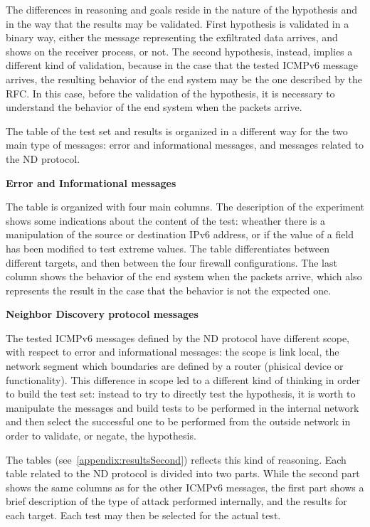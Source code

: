 \documentclass[12pt]{article}
\begin{document}
The differences in reasoning and goals reside in the nature of the hypothesis and in the way that the results may be validated. First hypothesis is validated in a binary way, either the message representing the exfiltrated data arrives, and shows on the receiver process, or not. The second hypothesis, instead, implies a different kind of validation, because in the case that the tested ICMPv6 message arrives, the resulting behavior of the end system may be the one described by the RFC. In this case, before the validation of the hypothesis, it is necessary to understand the behavior of the end system when the packets arrive.

The table of the test set and results is organized in a different way for the two main type of messages: error and informational messages, and messages related to the ND protocol.

\textbf{Error and Informational messages}

The table is organized with four main columns. The description of the experiment shows some indications about the content of the test: wheather there is a manipulation of the source or destination IPv6 address, or if the value of a field has been modified to test extreme values. The table differentiates between different targets, and then between the four firewall configurations. The last column shows the behavior of the end system when the packets arrive, which also represents the result in the case that the behavior is not the expected one.

\textbf{Neighbor Discovery protocol messages}

The tested ICMPv6 messages defined by the ND protocol have different scope, with respect to error and informational messages: the scope is link local, the network segment which boundaries are defined by a router (phisical device or functionality). This difference in scope led to a different kind of thinking in order to build the test set: instead to try to directly test the hypothesis, it is worth to manipulate the messages and build tests to be performed in the internal network and then select the successful one to be performed from the outside network in order to validate, or negate, the hypothesis.

The tables (see~\cref{appendix:resultsSecond}) reflects this kind of reasoning. Each table related to the ND protocol is divided into two parts. While the second part shows the same columns as for the other ICMPv6 messages, the first part shows a brief description of the type of attack performed internally, and the results for each target. Each test may then be selected for the actual test.
\end{document}
